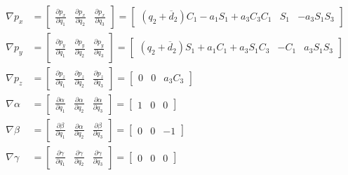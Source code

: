 \begin{align*}
\nabla p_x&=\begin{bmatrix}
\frac{\partial p_x}{\partial q_1}&\frac{\partial p_x}{\partial q_2}&\frac{\partial p_x}{\partial q_3}
\end{bmatrix}=\begin{bmatrix}
(q_2+\overline d_2)C_1-a_1S_1+a_3C_3C_1 &  S_1 & -a_3S_1S_3
\end{bmatrix}\\
\nabla p_y&=\begin{bmatrix}
\frac{\partial p_y}{\partial q_1}&\frac{\partial p_y}{\partial q_2}&\frac{\partial p_y}{\partial q_3}
\end{bmatrix}=\begin{bmatrix}
(q_2+\overline d_2)S_1+a_1C_1+a_3S_1C_3 &  -C_1 & a_3S_1S_3
\end{bmatrix}\\
\nabla p_z&=\begin{bmatrix}
\frac{\partial p_z}{\partial q_1}&\frac{\partial p_z}{\partial q_2}&\frac{\partial p_z}{\partial q_3}
\end{bmatrix}=\begin{bmatrix}
0 & 0 & a_3C_3
\end{bmatrix}\\
\nabla \alpha&=\begin{bmatrix}
\frac{\partial\alpha}{\partial q_1}&\frac{\partial\alpha}{\partial q_2}&\frac{\partial\alpha}{\partial q_3}
\end{bmatrix}=\begin{bmatrix}
1 & 0 & 0
\end{bmatrix}\\
\nabla \beta&=\begin{bmatrix}
\frac{\partial\beta}{\partial q_1}&\frac{\partial\alpha}{\partial q_2}&\frac{\partial\beta}{\partial q_3}
\end{bmatrix}=\begin{bmatrix}
0 & 0 & -1
\end{bmatrix}\\
\nabla \gamma&=\begin{bmatrix}
\frac{\partial\gamma}{\partial q_1}&\frac{\partial\gamma}{\partial q_2}&\frac{\partial\gamma}{\partial q_3}
\end{bmatrix}=\begin{bmatrix}
0 & 0 & 0
\end{bmatrix}
\end{align*}

\newpage

